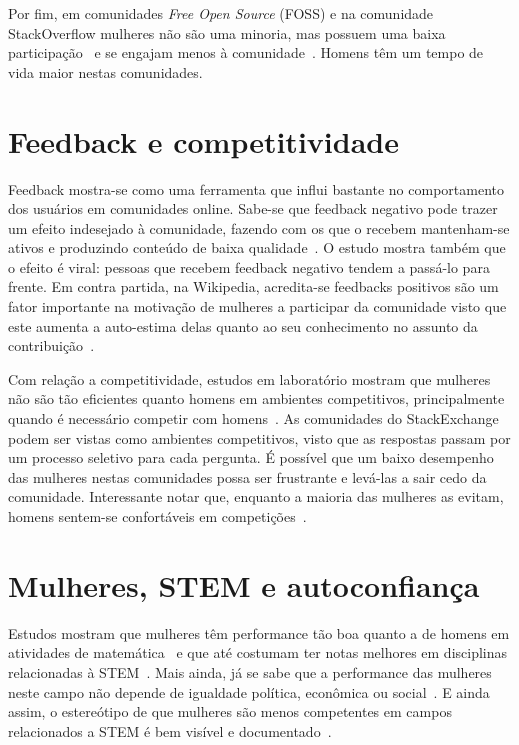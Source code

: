 Por fim, em comunidades \textit{Free Open Source} (FOSS) e na comunidade StackOverflow mulheres não são uma minoria, mas possuem uma baixa participação~\cite{rustad2011suck} e se engajam menos à comunidade~\cite{Vasilescu27092013}. Homens têm um tempo de vida maior nestas comunidades.


\section{Feedback e competitividade}

Feedback mostra-se como uma ferramenta que influi bastante no comportamento dos usuários em comunidades online. Sabe-se que feedback negativo pode trazer um efeito indesejado à comunidade, fazendo com os que o recebem mantenham-se ativos e produzindo conteúdo de baixa qualidade~\cite{cheng2014community}. O estudo mostra também que o efeito é viral: pessoas que recebem feedback negativo tendem a passá-lo para frente. Em contra partida, na Wikipedia, acredita-se feedbacks positivos são um fator importante na motivação de mulheres a participar da comunidade visto que este aumenta a auto-estima delas quanto ao seu conhecimento no assunto da contribuição~\cite{collier2012conflict}.

Com relação a competitividade, estudos em laboratório mostram que mulheres não são tão eficientes quanto homens em ambientes competitivos, principalmente quando é necessário competir com homens~\cite{gneezy2003performance}. As comunidades do StackExchange podem ser vistas como ambientes competitivos, visto que as respostas passam por um processo seletivo para cada pergunta. É possível que um baixo desempenho das mulheres nestas comunidades possa ser frustrante e levá-las a sair cedo da comunidade. Interessante notar que, enquanto a maioria das mulheres as evitam, homens sentem-se confortáveis em competições~\cite{niederle2005women,croson2009gender}.

\section{Mulheres, STEM e autoconfiança}
Estudos mostram que mulheres têm performance tão boa quanto a de homens em atividades de matemática~\cite{hyde1990gender,campbell1986effects} e que até costumam ter notas melhores em disciplinas relacionadas à STEM~\cite{stoet2015sex}. Mais ainda, já se sabe que a performance das mulheres neste campo não depende de igualdade política, econômica ou social~\cite{stoet2015sex}. E ainda assim, o estereótipo de que mulheres são menos competentes em campos relacionados a STEM é bem visível e documentado~\cite{moss2012science}.

